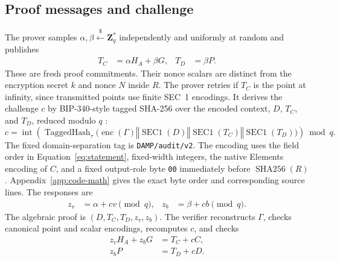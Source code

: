 \documentclass[11pt]{article}
\newcommand{\sha}{\operatorname{SHA256}}
\begin{document}
    \subsection{Proof messages and challenge}
    \label{sec:proof-messages}
    The prover samples $\alpha,\beta\overset{\$}{\leftarrow}\mathbf{Z}_q^{*}$ independently and uniformly at random and publishes
    \begin{align}
        T_C &= \alpha H_A+\beta G, & T_D &= \beta P. \label{eq:nonce-commitments}
    \end{align}
    These are fresh proof commitments.
    Their nonce scalars are distinct from the encryption secret $k$ and nonce $N$ inside $R$.
    The prover retries if $T_C$ is the point at infinity, since transmitted points use finite SEC~1 encodings.
    It derives the challenge $c$ by BIP-340-style tagged SHA-256 over the encoded context, $D$, $T_C$, and $T_D$, reduced modulo $q$ \cite{bip340}:
    \[
        c=\operatorname{int}\!\left(
                                  \operatorname{TaggedHash}_{\tau}
                                  \bigl(\operatorname{enc}(\Gamma)\mathbin\Vert\operatorname{SEC1}(D)
                                  \mathbin\Vert\operatorname{SEC1}(T_C)\mathbin\Vert\operatorname{SEC1}(T_D)\bigr)
        \right)\bmod q.
    \]
    The fixed domain-separation tag is \texttt{DAMP/audit/v2}.
    The encoding uses the field order in Equation~\ref{eq:statement}, fixed-width integers, the native Elements encoding of $C$, and a fixed output-role byte \texttt{00} immediately before $\sha(R)$.
    Appendix~\ref{app:code-math} gives the exact byte order and corresponding source lines.
    The responses are
    \begin{align}
        z_v&=\alpha+cv\pmod q, & z_b&=\beta+cb\pmod q. \label{eq:responses}
    \end{align}
    The algebraic proof is $(D,T_C,T_D,z_v,z_b)$.
    The verifier reconstructs $\Gamma$, checks canonical point and scalar encodings, recomputes $c$, and checks
    \begin{align}
        z_vH_A+z_bG &= T_C+cC, \label{eq:verify-commitment}\\
        z_bP &= T_D+cD. \label{eq:verify-handle}
    \end{align}
\end{document}
